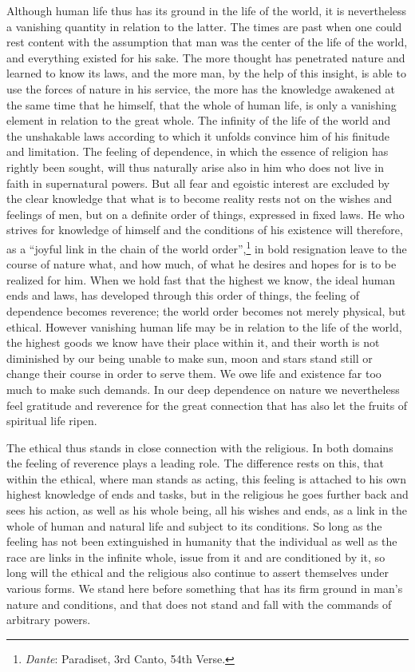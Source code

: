 \documentclass[12pt,a4paper,openany]{book}
\newcommand{\opage}[1]{\marginnote{\footnotesize\textit{[#1]}}}
\begin{document}
Although human life thus has its ground in the life of the world, it is
nevertheless a vanishing quantity in relation to the latter. The times are
past when one could \opage{85}rest content with the assumption that man was
the center of the life of the world, and everything existed for his sake. The
more thought has penetrated nature and learned to know its laws, and the more
man, by the help of this insight, is able to use the forces of nature in his
service, the more has the knowledge awakened at the same time that he himself,
that the whole of human life, is only a vanishing element in relation to the
great whole. The infinity of the life of the world and the unshakable laws
according to which it unfolds convince him of his finitude and limitation. The
feeling of dependence, in which the essence of religion has rightly been
sought, will thus naturally arise also in him who does not live in faith in
supernatural powers. But all fear and egoistic interest are excluded by the
clear knowledge that what is to become reality rests not on the wishes and
feelings of men, but on a definite order of things, expressed in fixed laws.
He who strives for knowledge of himself and the conditions of his existence
will therefore, as a ``joyful link in the chain of the world
order'',\footnote[1]{\emph{Dante}: Paradiset, 3rd Canto, 54th Verse.}
in bold resignation leave to the course of nature what, and how much, of what
he desires and hopes for is to be realized for him. When we hold fast that the
highest we know, the ideal human ends and laws, has developed through this
order of things, the feeling of dependence becomes reverence; the world order
becomes not merely physical, but ethical. However \opage{86}vanishing human
life may be in relation to the life of the world, the highest goods we know
have their place within it, and their worth is not diminished by our being
unable to make sun, moon and stars stand still or change their course in order
to serve them. We owe life and existence far too much to make such demands. In
our deep dependence on nature we nevertheless feel gratitude and reverence for
the great connection that has also let the fruits of spiritual life ripen.

The ethical thus stands in close connection with the religious. In both
domains the feeling of reverence plays a leading role. The difference rests on
this, that within the ethical, where man stands as acting, this feeling is
attached to his own highest knowledge of ends and tasks, but in the religious
he goes further back and sees his action, as well as his whole being, all his
wishes and ends, as a link in the whole of human and natural life and subject
to its conditions. So long as the feeling has not been extinguished in
humanity that the individual as well as the race are links in the infinite
whole, issue from it and are conditioned by it, so long will the ethical and
the religious also continue to assert themselves under various forms. We stand
here before something that has its firm ground in man's nature and conditions,
and that does not stand and fall with the commands of arbitrary powers.
\end{document}
